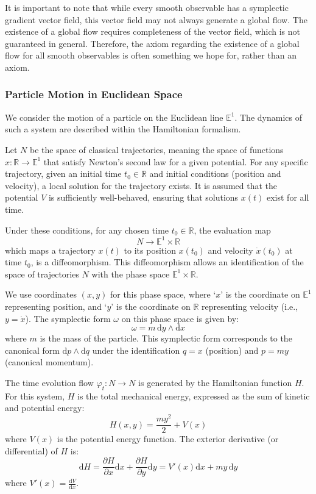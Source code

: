 \begin{remark}
It is important to note that while every smooth observable has a symplectic gradient vector field, this vector field may not always generate a global flow. The existence of a global flow requires completeness of the vector field, which is not guaranteed in general. Therefore, the axiom regarding the existence of a global flow for all smooth observables is often something we hope for, rather than an axiom.
\end{remark}

\subsubsection{Particle Motion in Euclidean Space}

We consider the motion of a particle on the Euclidean line $\mathbb{E}^1$. The dynamics of such a system are described within the Hamiltonian formalism.

Let $N$ be the space of classical trajectories, meaning the space of functions $x: \mathbb{R} \to \mathbb{E}^1$ that satisfy Newton's second law for a given potential. For any specific trajectory, given an initial time $t_0 \in \mathbb{R}$ and initial conditions (position and velocity), a local solution for the trajectory exists. It is assumed that the potential $V$ is sufficiently well-behaved, ensuring that solutions $x(t)$ exist for all time.

Under these conditions, for any chosen time $t_0 \in \mathbb{R}$, the evaluation map
\[
N \longrightarrow \mathbb{E}^1 \times \mathbb{R}
\]
which maps a trajectory $x(t)$ to its position $x(t_0)$ and velocity $\dot{x}(t_0)$ at time $t_0$, is a diffeomorphism. This diffeomorphism allows an identification of the space of trajectories $N$ with the phase space $\mathbb{E}^1 \times \mathbb{R}$.

We use coordinates $(x, y)$ for this phase space, where `$x$' is the coordinate on $\mathbb{E}^1$ representing position, and `$y$' is the coordinate on $\mathbb{R}$ representing velocity (i.e., $y=\dot{x}$). The symplectic form $\omega$ on this phase space is given by:
\[
\omega = m \, \mathrm{d}y \wedge \mathrm{d}x
\]
where $m$ is the mass of the particle. This symplectic form corresponds to the canonical form $\mathrm{d}p \wedge \mathrm{d}q$ under the identification $q=x$ (position) and $p=my$ (canonical momentum).

The time evolution flow $\varphi_t: N \to N$ is generated by the Hamiltonian function $H$. For this system, $H$ is the total mechanical energy, expressed as the sum of kinetic and potential energy:
\[
H(x,y) = \frac{my^2}{2} + V(x)
\]
where $V(x)$ is the potential energy function. The exterior derivative (or differential) of $H$ is:
\[ \mathrm{d}H = \frac{\partial H}{\partial x} \mathrm{d}x + \frac{\partial H}{\partial y} \mathrm{d}y = V'(x) \mathrm{d}x + my \, \mathrm{d}y \]
where $V'(x) = \frac{\mathrm{d}V}{\mathrm{d}x}$.

